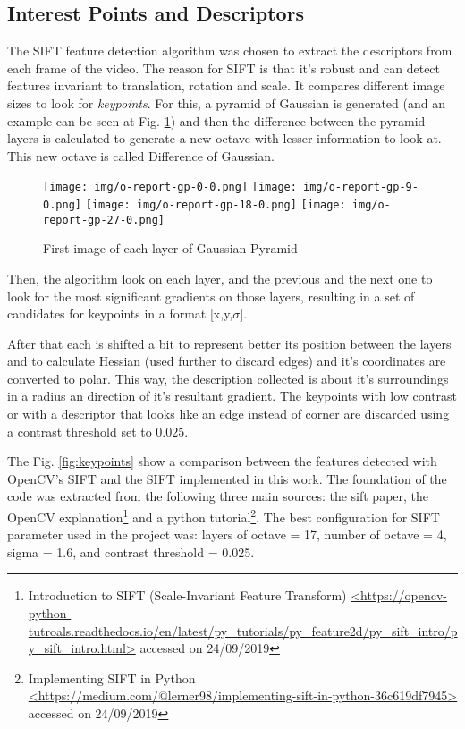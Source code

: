 \documentclass[]{IEEEtran}
\begin{document}
\subsection{Interest Points and Descriptors}

  The SIFT feature detection algorithm was chosen to extract the descriptors from each frame of the video. The reason for SIFT is that it's robust and can detect features invariant to translation, rotation and scale. It compares different image sizes to look for \textit{keypoints}. For this, a pyramid of Gaussian is generated (and an example can be seen at Fig. \ref{fig:gp}) and then the difference between the pyramid layers is calculated to generate a new octave with lesser information to look at. This new octave is called Difference of Gaussian.
 
 \begin{figure}[H]
     \centering
     \texttt{[image: img/o-report-gp-0-0.png]}
     \texttt{[image: img/o-report-gp-9-0.png]}
     \texttt{[image: img/o-report-gp-18-0.png]}
     \texttt{[image: img/o-report-gp-27-0.png]}
     \caption{First image of each layer of Gaussian Pyramid}
     \label{fig:gp}
 \end{figure}
 Then, the algorithm look on each layer, and the previous and the next one to look for the most significant gradients on those layers, resulting in a set of candidates for keypoints in a format [x,y,$\sigma$].
 
 After that each is shifted a bit to represent better its position between the layers and to calculate Hessian (used further to discard edges) and it's coordinates are converted to polar. This way, the description collected is about it's surroundings in a radius an direction of it's resultant gradient. The keypoints with low contrast or with a descriptor that looks like an edge instead of corner are discarded using a contrast threshold set to $0.025$.
 
 The Fig. \ref{fig:keypoints} show a comparison between the features detected with OpenCV's SIFT and the SIFT implemented in this work. The foundation of the code was extracted from the following three main sources: the sift paper, the OpenCV explanation\footnote{Introduction to SIFT (Scale-Invariant Feature Transform) \url{<https://opencv-python-tutroals.readthedocs.io/en/latest/py_tutorials/py_feature2d/py_sift_intro/py_sift_intro.html>} accessed on 24/09/2019} and a python tutorial\footnote{Implementing SIFT in Python \url{<https://medium.com/@lerner98/implementing-sift-in-python-36c619df7945>} accessed on 24/09/2019}. The best configuration for SIFT parameter used in the project was: layers of octave = 17, number of octave = 4, sigma = 1.6, and contrast threshold = 0.025.
 
\end{document}
